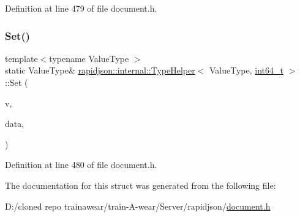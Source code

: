Definition at line 479 of file document.\+h.


\begin{DoxyCode}{0}

\end{DoxyCode}
\mbox{\label{structrapidjson_1_1internal_1_1_type_helper_3_01_value_type_00_01int64__t_01_4_ac7c3c6f948211da66ab9688ed198c252}} 
\subsubsection{\texorpdfstring{Set()}{Set()}\hspace{0.1cm}{\footnotesize\ttfamily [2/2]}}
{\footnotesize\ttfamily template$<$typename Value\+Type $>$ \\
static Value\+Type\& \mbox{\hyperlink{structrapidjson_1_1internal_1_1_type_helper}{rapidjson\+::internal\+::\+Type\+Helper}}$<$ Value\+Type, \mbox{\hyperlink{stdint_8h_a414156feea104f8f75b4ed9e3121b2f6}{int64\+\_\+t}} $>$\+::Set (\begin{DoxyParamCaption}\item[{Value\+Type \&}]{v,  }\item[{\mbox{\hyperlink{stdint_8h_a414156feea104f8f75b4ed9e3121b2f6}{int64\+\_\+t}}}]{data,  }\item[{typename Value\+Type\+::\+Allocator\+Type \&}]{ }\end{DoxyParamCaption})\hspace{0.3cm}{\ttfamily [static]}}



Definition at line 480 of file document.\+h.


\begin{DoxyCode}{0}

\end{DoxyCode}


The documentation for this struct was generated from the following file\+:\begin{DoxyCompactItemize}
\item 
D\+:/cloned repo trainawear/train-\/\+A-\/wear/\+Server/rapidjson/\mbox{\hyperlink{document_8h}{document.\+h}}\end{DoxyCompactItemize}
